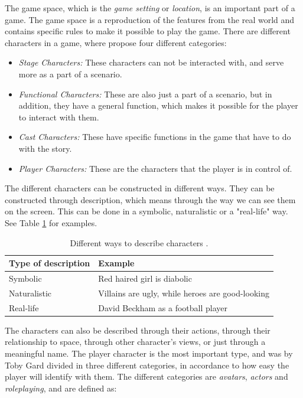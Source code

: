 The game space, which is the \emph{game setting} or \emph{location}, is an important part of a game. The game space is a reproduction of the features from the real world and contains specific rules to make it possible to play the game. There are different characters in a game, where \cite{understandingvg} propose four different categories: 

\begin{itemize}
\item \emph{Stage Characters:} These characters can not be interacted with, and serve more as a part of a scenario. \\
\item \emph{Functional Characters:} These are also just a part of a scenario, but in addition, they have a general function, which makes it possible for the player to interact with them. \\
\item \emph{Cast Characters:} These have specific functions in the game that have to do with the story. \\
\item \emph{Player Characters:} These are the characters that the player is in control of. 
\end{itemize}

The different characters can be constructed in different ways. They can be constructed through description, which means through the way we can see them on the screen. This can be done in a symbolic, naturalistic or a "real-life" way. See Table \ref{tab:description} for examples.

\begin{table} [H]
\centering
    \begin{tabular}{|l|l|}
        \hline
        \textbf{Type of description} & \textbf{Example} \\ \hline
       Symbolic & Red haired girl is diabolic  \\ \hline
       Naturalistic & Villains are ugly, while heroes are good-looking \\ \hline
       Real-life & David Beckham as a football player \\ \hline
    \end{tabular}
    \caption[Different ways to describe characters]{Different ways to describe characters \cite{understandingvg}.}
    \label{tab:description}
\end{table} 

The characters can also be described through their actions, through their relationship to space, through other character’s views, or just through a meaningful name. The player character is the most important type, and was by Toby Gard divided in three different categories, in accordance to how easy the player will identify with them. The different categories are \emph{avatars}, \emph{actors} and \emph{roleplaying}, and are defined as:

